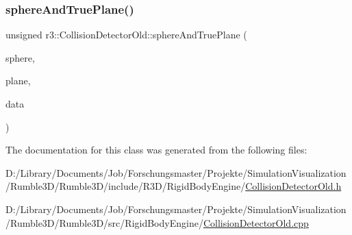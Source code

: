 \mbox{\label{classr3_1_1_collision_detector_old_ac193fb110bfd2618ed61aa59b72c6877}} 
\subsubsection{\texorpdfstring{sphere\+And\+True\+Plane()}{sphereAndTruePlane()}}
{\footnotesize\ttfamily unsigned r3\+::\+Collision\+Detector\+Old\+::sphere\+And\+True\+Plane (\begin{DoxyParamCaption}\item[{const \mbox{\hyperlink{classr3_1_1_collision_sphere}{Collision\+Sphere}} \&}]{sphere,  }\item[{const \mbox{\hyperlink{classr3_1_1_collision_plane}{Collision\+Plane}} \&}]{plane,  }\item[{\mbox{\hyperlink{classr3_1_1_collision_data_old}{Collision\+Data\+Old}} $\ast$}]{data }\end{DoxyParamCaption})\hspace{0.3cm}{\ttfamily [static]}}



The documentation for this class was generated from the following files\+:\begin{DoxyCompactItemize}
\item 
D\+:/\+Library/\+Documents/\+Job/\+Forschungsmaster/\+Projekte/\+Simulation\+Visualization/\+Rumble3\+D/\+Rumble3\+D/include/\+R3\+D/\+Rigid\+Body\+Engine/\mbox{\hyperlink{_collision_detector_old_8h}{Collision\+Detector\+Old.\+h}}\item 
D\+:/\+Library/\+Documents/\+Job/\+Forschungsmaster/\+Projekte/\+Simulation\+Visualization/\+Rumble3\+D/\+Rumble3\+D/src/\+Rigid\+Body\+Engine/\mbox{\hyperlink{_collision_detector_old_8cpp}{Collision\+Detector\+Old.\+cpp}}\end{DoxyCompactItemize}
